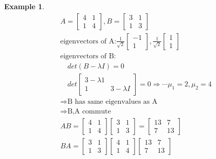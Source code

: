 \documentclass[12pt]{amsart}
\newtheorem*{example}{Example}      %
\numberwithin{equation}{theorem}    %
\newcommand{\drawvec}[1]{                    %
    \begin{bmatrix}
        #1
    \end{bmatrix}
}
\begin{document}
\begin{example}
    \begin{align*}
         & A = \drawvec{4                                           & 1 \\1&4}, B = \drawvec{3&1\\1&3} \\
         & \text{eigenvectors of A:} \frac{1}{\sqrt{2}} \drawvec{-1     \\1}, \frac{1}{\sqrt{2}} \drawvec{1\\1} \\
         & \text{eigenvectors of B:}                                    \\
         & \quad det(B-\lambda I) = 0                                   \\
         & \quad det \drawvec{3-\lambda  1                              \\ 1 & 3-\lambda I} = 0 \Rightarrow \cdots \mu_1=2, \mu_2=4 \\
         & \Rightarrow \text{B has same eigenvalues as A}               \\
         & \Rightarrow \text{B,A commute}                               \\
         & AB =
        \begin{bmatrix}
            4 & 1 \\
            1 & 4
        \end{bmatrix}
        \begin{bmatrix}
            3 & 1 \\
            1 & 3
        \end{bmatrix}
        = \begin{bmatrix}
            13 & 7  \\
            7  & 13
        \end{bmatrix}                                    \\
         & BA =
        \begin{bmatrix}
            3 & 1 \\
            1 & 3
        \end{bmatrix}
        \begin{bmatrix}
            4 & 1 \\
            1 & 4
        \end{bmatrix}
        \begin{bmatrix}
            13 & 7  \\
            7  & 13
        \end{bmatrix}
    \end{align*}
\end{example}
\end{document}
